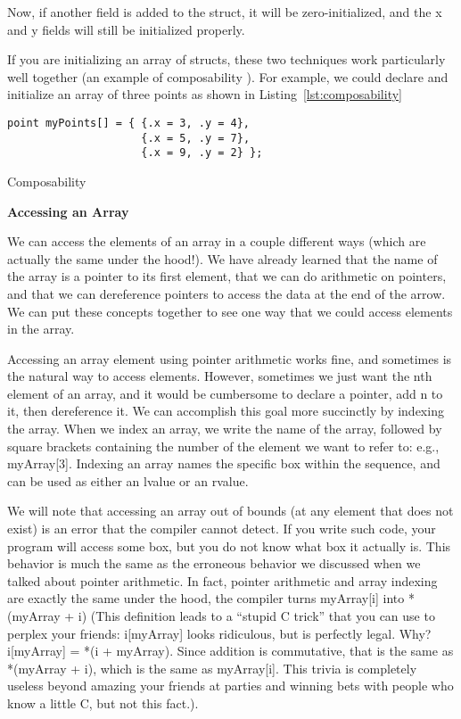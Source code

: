 \documentclass[11pt, a4paper]{article}
\begin{document}
Now, if another field is added to the struct, it will be zero-initialized, and the x and y fields will still be initialized properly.

If you are initializing an array of structs, these two techniques work particularly well together (an example of composability ). For example, we could declare and initialize an array of three points as shown in Listing~\ref{lst:composability}


\begin{listing}
\begin{verbatim}
point myPoints[] = { {.x = 3, .y = 4},
                     {.x = 5, .y = 7},
                     {.x = 9, .y = 2} };
\end{verbatim}
\caption{Composability}
\label{lst:composability}
\end{listing}



\textbf{Accessing an Array}

We can access the elements of an array in a couple different ways (which are actually the same under the hood!). We have already learned that the name of the array is a pointer to its first element, that we can do arithmetic on pointers, and that we can dereference pointers to access the data at the end of the arrow. We can put these concepts together to see one way that we could access elements in the array.

Accessing an array element using pointer arithmetic works fine, and sometimes is the natural way to access elements. However, sometimes we just want the nth element of an array, and it would be cumbersome to declare a pointer, add n to it, then dereference it. We can accomplish this goal more succinctly by indexing the array. When we index an array, we write the name of the array, followed by square brackets containing the number of the element we want to refer to: e.g., myArray[3]. Indexing an array names the specific box within the sequence, and can be used as either an lvalue or an rvalue.


We will note that accessing an array out of bounds (at any element that does not exist) is an error that the compiler cannot detect. If you write such code, your program will access some box, but you do not know what box it actually is. This behavior is much the same as the erroneous behavior we discussed when we talked about pointer arithmetic. In fact, pointer arithmetic and array indexing are exactly the same under the hood, the compiler turns myArray[i] into *(myArray + i) (This definition leads to a “stupid C trick” that you can use to perplex your friends: i[myArray] looks ridiculous, but is perfectly legal. Why? i[myArray] = *(i + myArray). Since addition is commutative, that is the same as *(myArray + i), which is the same as myArray[i]. This trivia is completely useless beyond amazing your friends at parties and winning bets with people who know a little C, but not this fact.).
\end{document}
